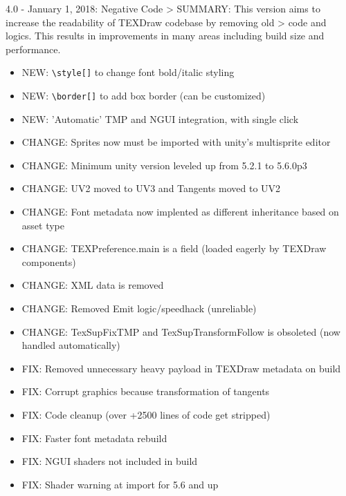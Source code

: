 \documentclass[12pt]{article}
\begin{document}
4.0 - January 1, 2018: Negative Code
> SUMMARY: This version aims to increase the readability of TEXDraw codebase by removing old
> code and logics. This results in improvements in many areas including build size and performance.

\begin{itemize}
\item NEW: \verb|\style[]| to change font bold/italic styling
\item NEW: \verb|\border[]| to add box border (can be customized)
\item NEW: 'Automatic' TMP and NGUI integration, with single click
\item CHANGE: Sprites now must be imported with unity's multisprite editor
\item CHANGE: Minimum unity version leveled up from 5.2.1 to 5.6.0p3
\item CHANGE: UV2 moved to UV3 and Tangents moved to UV2
\item CHANGE: Font metadata now implented as different inheritance based on asset type
\item CHANGE: TEXPreference.main is a field (loaded eagerly by TEXDraw components)
\item CHANGE: XML data is removed
\item CHANGE: Removed Emit logic/speedhack (unreliable)
\item CHANGE: TexSupFixTMP and TexSupTransformFollow is obsoleted (now handled automatically)
\item FIX: Removed unnecessary heavy payload in TEXDraw metadata on build
\item FIX: Corrupt graphics because transformation of tangents
\item FIX: Code cleanup (over +2500 lines of code get stripped)
\item FIX: Faster font metadata rebuild
\item FIX: NGUI shaders not included in build
\item FIX: Shader warning at import for 5.6 and up
\end{itemize}
\end{document}
